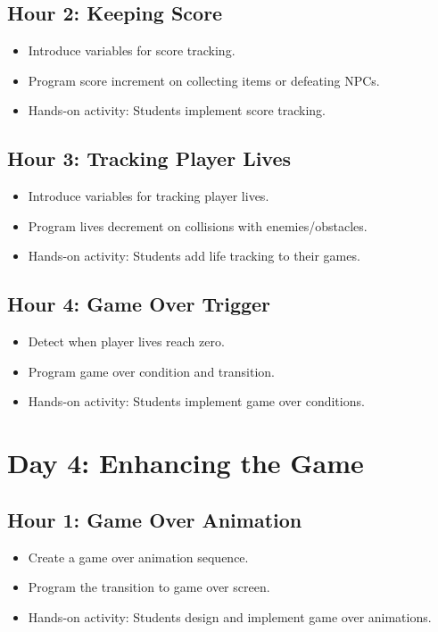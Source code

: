 \documentclass[main.tex]{subfiles}
\begin{document}
\subsection*{Hour 2: Keeping Score}
\begin{itemize}
    \item Introduce variables for score tracking.
    \item Program score increment on collecting items or defeating NPCs.
    \item Hands-on activity: Students implement score tracking.
\end{itemize}

\subsection*{Hour 3: Tracking Player Lives}
\begin{itemize}
    \item Introduce variables for tracking player lives.
    \item Program lives decrement on collisions with enemies/obstacles.
    \item Hands-on activity: Students add life tracking to their games.
\end{itemize}

\subsection*{Hour 4: Game Over Trigger}
\begin{itemize}
    \item Detect when player lives reach zero.
    \item Program game over condition and transition.
    \item Hands-on activity: Students implement game over conditions.
\end{itemize}

\section*{Day 4: Enhancing the Game}
\subsection*{Hour 1: Game Over Animation}
\begin{itemize}
    \item Create a game over animation sequence.
    \item Program the transition to game over screen.
    \item Hands-on activity: Students design and implement game over animations.
\end{itemize}
\end{document}
